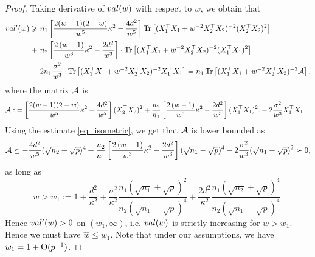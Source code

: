 \begin{proof}
Taking derivative of $\val(w)$ with respect to $w$, we obtain that 
\begin{align*}
\val'(w) \ge &~ n_1\left[ \frac{2(w-1)(2-w)}{w^5}\kappa^2 - \frac{4d^2}{w^5}\right] \tr\left[( X_1^{\top}X_1 +w^{-2}X_2^{\top}X_2)^{-2} (X_2^{\top}X_2)^2\right]   \\
+&~ n_2\left[\frac{2\left( w-1\right)}{w^3}\kappa^2 - \frac{2d^2}{w^3} \right]\cdot \tr\left[( X_1^{\top}X_1 +w^{-2}X_2^{\top}X_2)^{-2} (X_1^{\top}X_1)^2\right] \nonumber\\
		-&~ 2n_1 \frac{\sigma^2}{w^3} \cdot \bigtr{(X_1^{\top}X_1 + w^{-2}X_2^{\top}X_2)^{-2} X_1^\top X_1  } = n_1 \bigtr{(X_1^{\top}X_1 + w^{-2}X_2^{\top}X_2)^{-2} \cal A },
\end{align*}
where the matrix $\cal A$ is
\begin{align*}
\cal A :&= \left[ \frac{2(w-1)(2-w)}{w^5}\kappa^2 - \frac{4d^2}{w^5}\right](X_2^{\top}X_2)^2 + \frac{n_2}{n_1} \left[\frac{2\left( w-1\right)}{w^3}\kappa^2 - \frac{2d^2}{w^3} \right](X_1^{\top}X_1)^2. - 2\frac{\sigma^2}{w^3}X_1^\top X_1
\end{align*}
Using the estimate \eqref{eq_isometric}, we get that $\cal A$ is lower bounded as
\begin{align*}
\cal A \succeq - \frac{4d^2}{w^5}(\sqrt{n_2}+\sqrt{p})^4 + \frac{n_2}{n_1} \left[\frac{2\left( w-1\right)}{w^3}\kappa^2 - \frac{2d^2}{w^3} \right](\sqrt{n_1}-\sqrt{p})^4 - 2\frac{\sigma^2}{w^3}(\sqrt{n_1}+\sqrt{p})^2\succ 0,
\end{align*}
as long as 
$$w> w_1:=1 +\frac{d^2}{\kappa^2}+ \frac{\sigma^2}{\kappa^2}\frac{n_1(\sqrt{n_1}+\sqrt{p})^2}{n_2(\sqrt{n_1}-\sqrt{p})^4}+ \frac{2d^2}{\kappa^2}\frac{n_1(\sqrt{n_2}+\sqrt{p})^4}{n_2(\sqrt{n_1}-\sqrt{p})^4}.$$
Hence $\val'(w)>0$ on $(w_1,\infty)$, i.e. $\val(w)$ is strictly increasing for $w>w_1$. Hence we must have $\hat w\le w_1$. Note that under our assumptions, we have $w_1=1+\OO(p^{-1})$. 


\end{proof}
